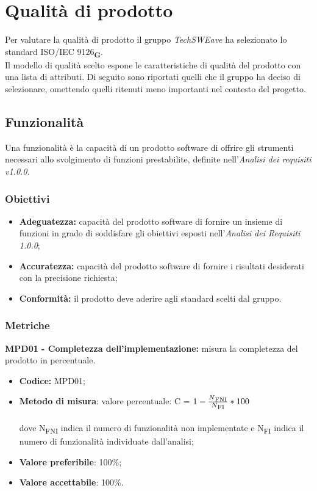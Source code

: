 \section{Qualità di prodotto}
Per valutare la qualità di prodotto il gruppo  \textit{TechSWEave} ha selezionato lo standard ISO/IEC 9126\textsubscript{\textbf{G}}.\\
Il modello di qualità scelto espone le caratteristiche di qualità del prodotto con una lista di attributi. Di seguito sono riportati quelli che il 
gruppo ha deciso di selezionare, omettendo quelli ritenuti meno importanti nel contesto del progetto.
\subsection{Funzionalità}
Una funzionalità è la capacità di un prodotto software di offrire gli strumenti necessari allo svolgimento di funzioni prestabilite, definite 
nell'\textit{Analisi dei requisiti v1.0.0.}
\subsubsection{Obiettivi}
\begin{itemize}
    \item \textbf{Adeguatezza:} capacità del prodotto software di fornire un insieme di funzioni in grado
    di soddisfare gli obiettivi esposti nell’\textit{Analisi dei Requisiti 1.0.0};
    \item \textbf{Accuratezza:} capacità del prodotto software di fornire i risultati desiderati con la precisione richiesta;
    \item \textbf{Conformità:} il prodotto deve aderire agli standard scelti dal gruppo.
\end{itemize}
\subsubsection{Metriche}
\textbf{MPD01 - Completezza dell'implementazione:} misura la completezza del prodotto in percentuale.
\begin{itemize}
    \item \textbf{Codice:} MPD01;
    \item \textbf{Metodo di misura}: valore percentuale: C = $1-\frac{N\textsubscript{FNI}}{N\textsubscript{FI}}*100$ \\
    \\dove N\textsubscript{FNI} indica il numero di funzionalità non implementate e N\textsubscript{FI} indica il numero di funzionalità 
    individuate dall'analisi;
    \item \textbf{Valore preferibile}: 100\%;
    \item \textbf{Valore accettabile}: 100\%.
\end{itemize}
